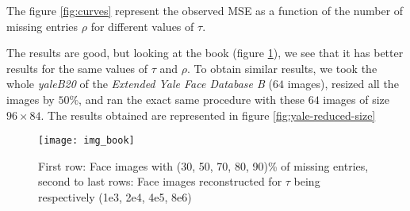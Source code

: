 \documentclass[a4paper, 11pt]{article}
\newcommand{\name}[1]{\emph{#1}}
\begin{document}



The figure \ref{fig:curves} represent the observed MSE as a function
of the number of missing entries $\rho$ for different values of
$\tau$.  %


The results are good, but looking at the book
\hspace{0.3em}\cite{vidal} (figure \ref{fig:faces-book}), we see that
it has better results for the same values of $\tau$ and $\rho$. To
obtain similar results, we took the whole \name{yaleB20} of the
\emph{Extended Yale Face Database B}\hspace{.3em} \cite{yale} ($64$
images), resized all the images by $50\%$, and ran the exact same
procedure with these $64$ images of size $96 \times 84$. The results
obtained are represented in figure \ref{fig:yale-reduced-size}

\begin{figure}[h]
  \centering
  \texttt{[image: img\_book]}
  \caption{First row: Face images with (30, 50, 70, 80, 90)\% of
    missing entries, second to last rows: Face images reconstructed
    for $\tau$ being respectively (1e3, 2e4, 4e5, 8e6)}
  \label{fig:faces-book}
\end{figure}
\end{document}
